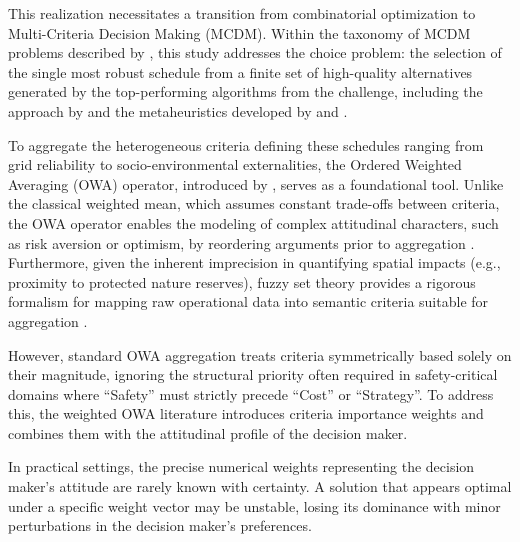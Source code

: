 This realization necessitates a transition from combinatorial optimization to Multi-Criteria Decision Making (MCDM). Within the taxonomy of MCDM problems described by \citet{roy1996multicriteria}, this study addresses the choice problem: the selection of the single most robust schedule from a finite set of high-quality alternatives generated by the top-performing algorithms from the challenge, including the approach by \citet{top1roadef} and the metaheuristics developed by \citet{Consueloroadef} and \citet{top5roadef}.

To aggregate the heterogeneous criteria defining these schedules ranging from grid reliability to socio-environmental externalities, the Ordered Weighted Averaging (OWA) operator, introduced by \citet{Yager1988OWA}, serves as a foundational tool. Unlike the classical weighted mean, which assumes constant trade-offs between criteria, the OWA operator enables the modeling of complex attitudinal characters, such as risk aversion or optimism, by reordering arguments prior to aggregation \cite{SurveyEmrouznejad2014}. Furthermore, given the inherent imprecision in quantifying spatial impacts (e.g., proximity to protected nature reserves), fuzzy set theory provides a rigorous formalism for mapping raw operational data into semantic criteria suitable for aggregation \cite{zadeh1965fuzzy}.

However, standard OWA aggregation treats criteria symmetrically based solely on their magnitude, ignoring the structural priority often required in safety-critical domains where ``Safety'' must strictly precede ``Cost'' or ``Strategy''. To address this, the weighted OWA literature \cite{WOWA} introduces criteria importance weights and combines them with the attitudinal profile of the decision maker.

In practical settings, the precise numerical weights representing the decision maker's attitude are rarely known with certainty. A solution that appears optimal under a specific weight vector may be unstable, losing its dominance with minor perturbations in the decision maker's preferences.

